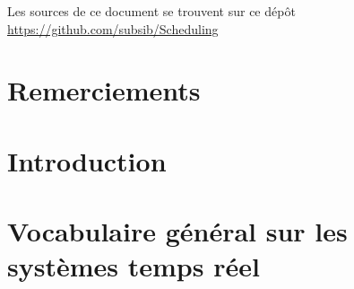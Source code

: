 \documentclass[11pt,a4paper,oneside]{report}
\begin{document}
	\newpage
	\thispagestyle{empty}
	\null%
	\vfill    
	\begin{center}
		Les sources de ce document se trouvent sur ce dépôt \href{https://github.com/subsib/Scheduling}{https://github.com/subsib/Scheduling}
	\end{center}
	\null
	
	\newenvironment{vcenterpage}
	{\newpage\thispagestyle{empty} 
		\vspace*{\fill}}
	{\vspace*{\fill}\par\pagebreak}
	
	\setcounter{page}{0}
	\tableofcontents
%	

	

	
\chapter*{Remerciements}
\thispagestyle{empty}

\newpage
\thispagestyle{empty}
\mbox{}
\newpage
\fancyhead{}

\chapter*{Introduction}{}
	\setcounter{page}{1}

	

\chapter{Vocabulaire général sur les systèmes temps réel}
	\fancyhead[L]{\leftmark}
\end{document}
